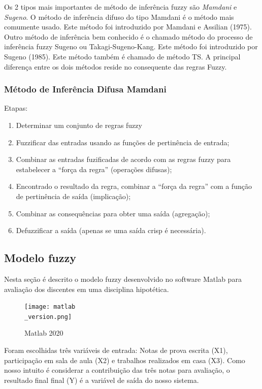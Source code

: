 \documentclass{article}
\begin{document}
Os 2 tipos mais importantes de método de inferência fuzzy são
\emph{Mamdani} e \emph{Sugeno}. O método de inferência difuso do
tipo Mamdani é o método mais comumente usado. Este método foi
introduzido por Mamdani e Assilian (1975). Outro método de
inferência bem conhecido é o chamado método do processo de
inferência fuzzy Sugeno ou Takagi-Sugeno-Kang. Este método foi
introduzido por Sugeno (1985). Este método também é chamado de
método TS. A principal diferença entre os dois métodos reside no
consequente das regras Fuzzy.

\subsubsection{Método de Inferência Difusa Mamdani\citep{
ProfVolmirWilhelm}}

Etapas:

\begin{enumerate}
    \item Determinar um conjunto de regras fuzzy
	\item Fuzzificar das entradas usando as funções de
		pertinência de entrada;
	\item Combinar as entradas fuzificadas de acordo com as
		regras fuzzy para estabelecer a ``força da regra''
		(operações difusas);
	\item Encontrado o resultado da regra, combinar a ``força
		da regra'' com a função de pertinência de saída
		(implicação);
	\item Combinar as consequências para obter uma saída
		(agregação);
	\item Defuzzificar a saída (apenas se uma saída crisp é
		necessária).
\end{enumerate}


\subsection{Modelo fuzzy}

Nesta seção é descrito o modelo fuzzy desenvolvido no software
Matlab para avaliação dos discentes em uma disciplina
hipotética.

\begin{figure}[h!]
\centering
\texttt{[image: matlab\\\_version.png]}
\caption{Matlab 2020}
\label{fig:matlab_version}
\end{figure}

Foram escolhidas três variáveis de entrada: Notas de prova
escrita (X1), participação em sala de aula (X2) e trabalhos
realizados em casa (X3). Como nosso intuito é considerar a
contribuição das três notas para avaliação, o resultado final
final (Y) é a variável de saída do nosso sistema.
\end{document}
